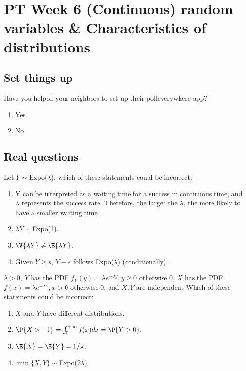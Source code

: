 \documentclass[poll_tutorial_format]{subfiles}
\begin{document}
	\maketitle
	\setcounter{section}{5}
	\section{PT Week 6 (Continuous) random variables \& Characteristics of distributions}
	
	\subsection{Set things up}
	\label{sec:set-things-up}
	
	
	
	\setcounter{theorem}{-1}
	\begin{exercise}
		Have you helped your neighbors to set up their polleverywhere app? 
		\begin{enumerate}
			\item Yes
			\item No
		\end{enumerate}
	\end{exercise}
	
	\subsection{Real questions}
	\label{sec:start-real-questions pt week 6}
	
	
	
	\begin{exercise}
		Let $Y\sim$Expo($\lambda$),
		which of these statements could be incorrect:
		\begin{enumerate}
			\item Y can be interpreted as a waiting time for a success in continuous time, and $\lambda$ represents the success rate. Therefore, the larger the $\lambda$, the more likely to have a smaller waiting time.  
			\item $\lambda Y\sim$Expo(1).
			\item $\V{\lambda Y} \neq \E{\lambda Y}$.
			\item Given $Y\geq s$, $Y-s$ follows Expo($\lambda$) (conditionally). 
		\end{enumerate}
	\end{exercise}
	
	
	\begin{exercise}
	$\lambda>0$,	$Y$ has the PDF $f_Y(y) = \lambda e^{-\lambda y}, y\geq 0$ otherwise 0, $X$ has the PDF $f(x) = \lambda e^{-\lambda x}, x> 0$ otherwise 0, and $X,Y$ are independent 
		Which of these statements could be incorrect:
		\begin{enumerate}
			\item $X$ and $Y$ have different distributions. 
			\item $\P{X>-1}=\int_{0}^{+\infty} f(x)dx=\P{Y>0}.$
			\item $\E{X} = \E{Y}=1/\lambda $. 
			\item $\min\{X,Y\}\sim$Expo($2\lambda$)
		\end{enumerate}
	\end{exercise}
	
\end{document}
